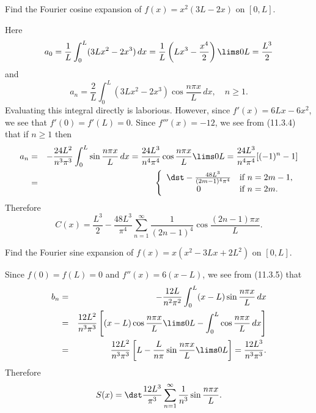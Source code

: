 \setcounter{example}{4}
\begin{example}
  \label{example:11.3.5} \rm Find the Fourier cosine expansion of $f(x)=x^{2}(3L-2x)$ on $[0,L]$.
\end{example}
\begin{examplesolution}
\solution Here
\[
  a_{0}=\frac{1}{L}\int_{0}^{L}(3Lx^{2}-2x^{3})\,dx=\frac{1}{L}\left(Lx^{3}-\frac{x^{4}}{2}\right)\lims0L=\frac{L^{3}}{2}
\]
and
\[
  a_{n}=\frac{2}{L}\int_{0}^{L}(3Lx^{2}-2x^{3})\cos\frac{n\pi x}{L}\,dx,\quad n\ge1.
\]
Evaluating this integral directly is laborious. However, since $f'(x)=6Lx-6x^{2}$, we see that
$f'(0)=f'(L)=0$. Since $f'''(x)=-12$, we see from (11.3.4) that if $n\ge1$ then
\begin{eqnarray*}
  a_{n}&=&-\frac{24L^{2}}{n^{3}\pi^{3}}\int_{0}^{L}\sin\frac{n\pi x}{L}\,dx =\frac{24L^{3}}{n^{4}\pi^{4}}\cos\frac{n\pi x}{L}\lims0L=\frac{24L^{3}}{n^{4}\pi^{4}}[(-1)^{n}-1]\\ &=& \left\{
  \begin{array}{cl}
    \dst-\frac{48L^{3}}{(2m-1)^{4}\pi^{4}} & \mbox{if $n=2m-1$}, \\
    0                                      & \mbox{if $n=2m$.}
  \end{array}\right.
\end{eqnarray*}
Therefore
\[
  C(x)=\frac{L^{3}}{2}-\frac{48L^{3}}{\pi^{4}}\sum_{n=1}^{\infty}\frac{1}{(2n-1)^{4}}\cos\frac{(2n-1)\pi x}{L}.
\]
\end{examplesolution}

\setcounter{example}{5}
\begin{example}
  \label{example:11.3.6} \rm Find the Fourier sine expansion of $f(x)=x(x^{2}-3Lx+2L^{2})$ on
  $[0,L]$.
\end{example}
\begin{examplesolution}
\solution Since $f(0)=f(L)=0$ and $f''(x)=6(x-L)$, we see from (11.3.5) that
\begin{eqnarray*}
  b_{n} & = & -\frac{12L}{n^{2}\pi^{2}}\int_{0}^{L}(x-L)\sin\frac{n\pi x}{L}\,dx                                             \\
        & = & \frac{12L^{2}}{n^{3}\pi^{3}}\left[(x-L)\cos\frac{n\pi x}{L}\lims0L-\int_{0}^{L}\cos\frac{n\pi x}{L}\,dx\right] \\
        & = & \frac{12L^{2}}{n^{3}\pi^{3}}\left[L-\frac{L}{n\pi}\sin\frac{n\pi x}{L}\lims0L\right]=\frac{12L^{3}}{n^{3}\pi^{3}}.
\end{eqnarray*}
Therefore
\[
  S(x)=\dst\frac{12L^{3}}{\pi^{3}}\sum_{n=1}^{\infty}\frac{1}{n^{3}}\sin\frac{n\pi x}{L}.
\]
\end{examplesolution}

